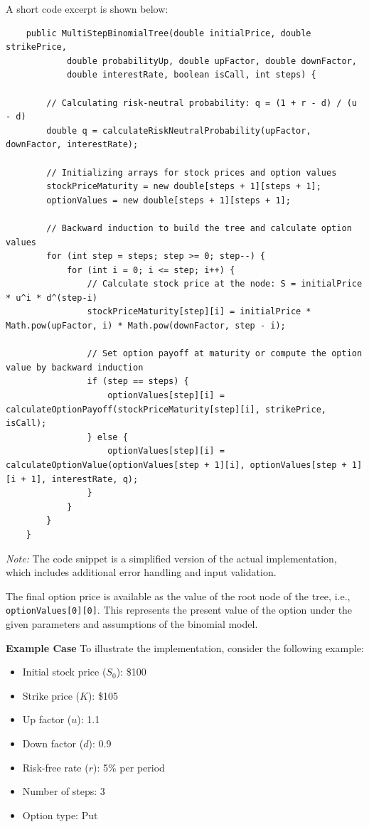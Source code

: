 \documentclass{article}
\begin{document}
    A short code excerpt is shown below:

    \small
    \begin{verbatim}
    public MultiStepBinomialTree(double initialPrice, double strikePrice,
            double probabilityUp, double upFactor, double downFactor,
            double interestRate, boolean isCall, int steps) {

        // Calculating risk-neutral probability: q = (1 + r - d) / (u - d)
        double q = calculateRiskNeutralProbability(upFactor, downFactor, interestRate);

        // Initializing arrays for stock prices and option values
        stockPriceMaturity = new double[steps + 1][steps + 1];
        optionValues = new double[steps + 1][steps + 1];

        // Backward induction to build the tree and calculate option values
        for (int step = steps; step >= 0; step--) {
            for (int i = 0; i <= step; i++) {
                // Calculate stock price at the node: S = initialPrice * u^i * d^(step-i)
                stockPriceMaturity[step][i] = initialPrice * Math.pow(upFactor, i) * Math.pow(downFactor, step - i);

                // Set option payoff at maturity or compute the option value by backward induction
                if (step == steps) {
                    optionValues[step][i] = calculateOptionPayoff(stockPriceMaturity[step][i], strikePrice, isCall);
                } else {
                    optionValues[step][i] = calculateOptionValue(optionValues[step + 1][i], optionValues[step + 1][i + 1], interestRate, q);
                }
            }
        }
    }
    \end{verbatim}

    \normalsize

    \emph{Note:} The code snippet is a simplified version of the actual implementation, which includes additional error handling and input validation.

    \medbreak

    The final option price is available as the value of the root node of the tree, i.e., \texttt{optionValues[0][0]}. This represents the present value of the option under the given parameters and assumptions of the binomial model.

    \medbreak

    \textbf{Example Case}
    To illustrate the implementation, consider the following example:

    \begin{itemize}
        \item Initial stock price (\( S_0 \)): \$100
        \item Strike price (\( K \)): \$105
        \item Up factor (\( u \)): 1.1
        \item Down factor (\( d \)): 0.9
        \item Risk-free rate (\( r \)): 5\% per period
        \item Number of steps: 3
        \item Option type: Put
    \end{itemize}
\end{document}
